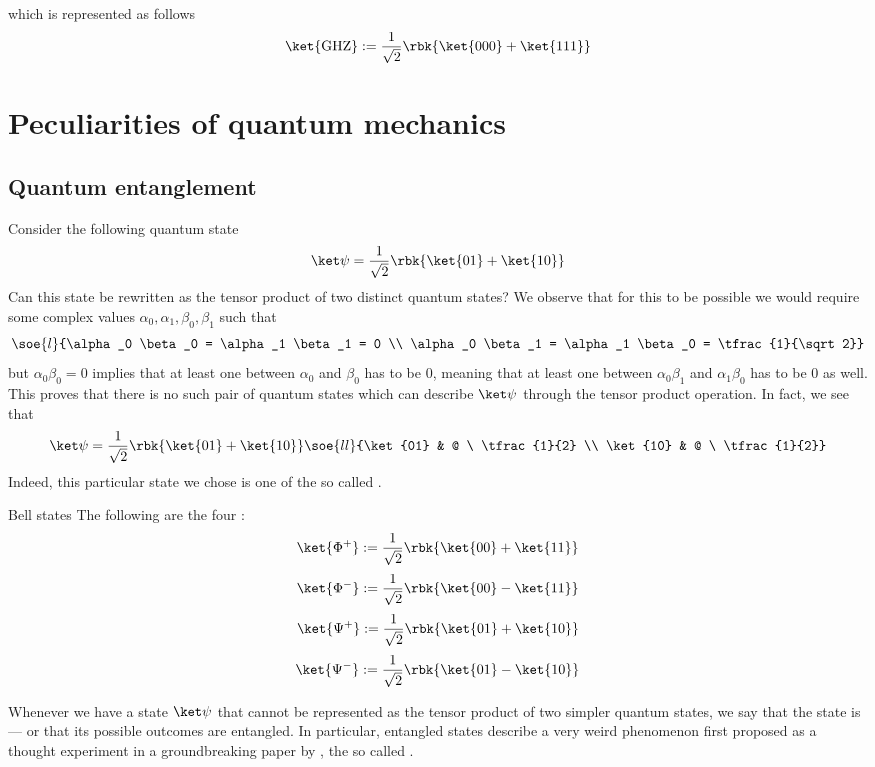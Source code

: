 \documentclass[a4paper, 12pt]{report}
\begin{document}

which is represented as follows $$\ket{\mbox{GHZ}} := \dfrac{1}{\sqrt 2}\rbk{\ket{000} + \ket{111}}$$

\section{Peculiarities of quantum mechanics}

\subsection{Quantum entanglement}

Consider the following quantum state $$\ket \psi = \dfrac{1}{\sqrt 2}\rbk{\ket {01} + \ket {10}}$$ Can this state be rewritten as the tensor product of two distinct quantum states? We observe that for this to be possible we would require some complex values $\alpha_0, \alpha_1, \beta_0, \beta_1$ such that $$\soe{l}{\alpha_0 \beta_0 = \alpha_1 \beta_1 = 0 \\ \alpha_0 \beta_1 = \alpha_1 \beta_0 = \tfrac{1}{\sqrt 2}}$$ but $\alpha_0 \beta_0 = 0$ implies that at least one between $\alpha_0$ and $\beta_0$ has to be 0, meaning that at least one between $\alpha_0\beta_1$ and $\alpha_1\beta_0$ has to be 0 as well. This proves that there is no such pair of quantum states which can describe $\ket \psi$ through the tensor product operation. In fact, we see that $$\ket \psi = \dfrac{1}{\sqrt 2}\rbk{\ket{01} + \ket{10}}  \soe{ll}{\ket{01} & @ \ \tfrac{1}{2} \\ \ket{10} & @ \ \tfrac{1}{2}}$$ Indeed, this particular state we chose is one of the so called .

\begin{frameddefn}{Bell states}
	The following are the four : $$\ket{\Phi^+} := \dfrac{1}{\sqrt 2}\rbk{\ket{00} + \ket{11}}$$ $$\ket{\Phi^-} := \dfrac{1}{\sqrt 2}\rbk{\ket{00} - \ket{11}}$$ $$\ket{\Psi^+} := \dfrac{1}{\sqrt 2}\rbk{\ket{01} + \ket{10}}$$ $$\ket{\Psi^-} := \dfrac{1}{\sqrt 2}\rbk{\ket{01} - \ket{10}}$$
\end{frameddefn}

Whenever we have a state $\ket \psi$ that cannot be represented as the tensor product of two simpler quantum states, we say that the state is  --- or that its possible outcomes are entangled. In particular, entangled states describe a very weird phenomenon first proposed as a thought experiment in a groundbreaking paper by  \cite{epr}, the so called .
\end{document}
